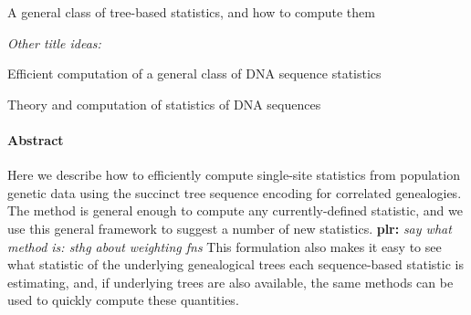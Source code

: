 \documentclass{article}
\newcommand{\plr}[1]{{\color{blue}\textbf{plr:} \it #1}}
\begin{document}
\begin{center}
    A general class of tree-based statistics,
    and how to compute them
\end{center}

\emph{Other title ideas:}

Efficient computation of a general class of DNA sequence statistics

Theory and computation of statistics of DNA sequences


\paragraph{Abstract}
Here we describe how to efficiently compute single-site statistics
from population genetic data using the succinct tree sequence
encoding for correlated genealogies.
The method is general enough to compute any currently-defined statistic,
and we use this general framework to suggest a number of new statistics.
\plr{say what method is: sthg about weighting fns}
This formulation also makes it easy to see what statistic of the underlying genealogical trees
each sequence-based statistic is estimating,
and, if underlying trees are also available,
the same methods can be used to quickly compute these quantities.


%
%
%
%
%
%
%
%
%
\end{document}

